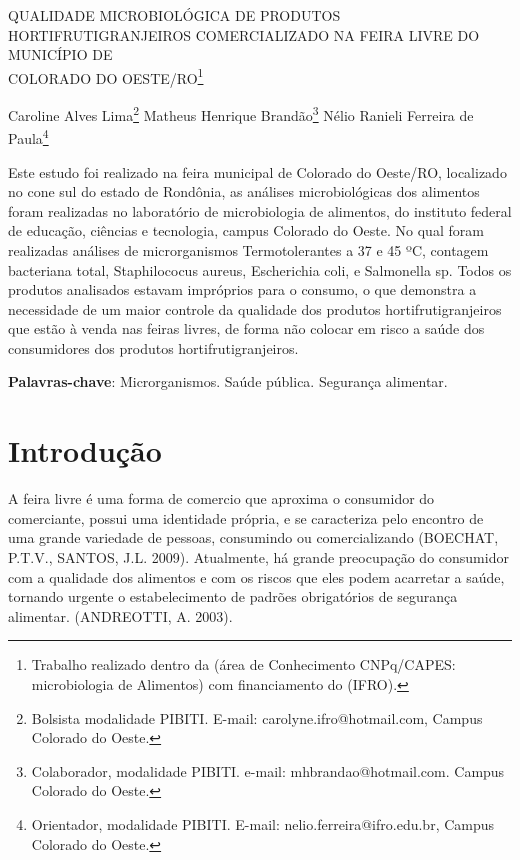 \documentclass[article,12pt,onesidea,4paper,english,brazil]{abntex2}
\begin{document}
	
	
	\frenchspacing 
	
	\begin{center}
		\LARGE QUALIDADE MICROBIOLÓGICA DE PRODUTOS HORTIFRUTIGRANJEIROS COMERCIALIZADO NA FEIRA LIVRE DO MUNICÍPIO DE\\COLORADO DO OESTE/RO\footnote{Trabalho realizado dentro da (área de Conhecimento CNPq/CAPES: microbiologia de Alimentos) com financiamento do (IFRO).}
		
		\normalsize
		Caroline Alves Lima\footnote{Bolsista modalidade PIBITI. E-mail: carolyne.ifro@hotmail.com, Campus Colorado do Oeste.} 
		Matheus Henrique Brandão\footnote{Colaborador, modalidade PIBITI. e-mail: mhbrandao@hotmail.com. Campus Colorado do Oeste.} 
		Nélio Ranieli Ferreira de Paula\footnote{Orientador, modalidade PIBITI. E-mail: nelio.ferreira@ifro.edu.br, Campus Colorado do Oeste.} 
	\end{center}
	
	\begin{resumoumacoluna}
	Este estudo foi realizado na feira municipal de Colorado do Oeste/RO, localizado no cone sul do estado de Rondônia, as análises microbiológicas dos alimentos foram realizadas no laboratório de microbiologia de alimentos, do instituto federal de educação, ciências e tecnologia, campus Colorado do Oeste. No qual foram realizadas análises de microrganismos Termotolerantes a 37 e 45 ºC, contagem bacteriana total, Staphilococus aureus, Escherichia coli, e Salmonella sp. Todos os produtos analisados estavam impróprios para o consumo, o que demonstra a necessidade de um maior controle da qualidade dos produtos hortifrutigranjeiros que estão à venda nas feiras livres, de forma não colocar em risco a saúde dos consumidores dos produtos hortifrutigranjeiros.
	
		\vspace{\onelineskip}
		
		\noindent
		\textbf{Palavras-chave}: Microrganismos. Saúde pública. Segurança alimentar.
	\end{resumoumacoluna}
	
	\section*{Introdução}
	
A feira livre é uma forma de comercio que aproxima o consumidor do comerciante, possui uma identidade própria, e se caracteriza pelo encontro de uma grande variedade de pessoas, consumindo ou comercializando (BOECHAT, P.T.V., SANTOS, J.L. 2009). Atualmente, há grande preocupação do consumidor com a qualidade dos alimentos e com os riscos que eles podem acarretar a saúde, tornando urgente o estabelecimento de padrões obrigatórios de segurança alimentar. (ANDREOTTI, A. 2003).
\end{document}
